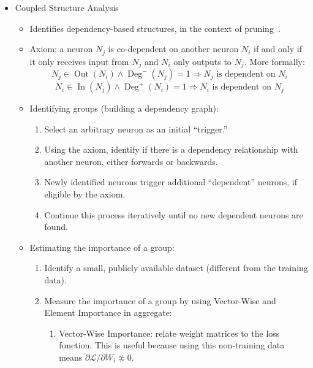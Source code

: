 
\begin{itemize}
    \item Coupled Structure Analysis
    \begin{itemize}
        \item Identifies dependency-based structures, in the context of pruning~\cite{ma2023llm}.
        \item Axiom: a neuron $N_j$ is co-dependent on another neuron $N_i$ if and only if it only receives input from $N_j$ and $N_i$ only outputs to $N_j$.
         More formally:
        \begin{equation}
             N_j \in \operatorname{Out}(N_i) \wedge \operatorname{Deg}^-(N_j) = 1 \Rightarrow N_j \text{ is dependent on } N_i\label{eq:equation}
        \end{equation}
        \begin{equation}
             N_i \in \operatorname{In}(N_j) \wedge \operatorname{Deg}^+(N_i) = 1 \Rightarrow N_i \text{ is dependent on } N_j\label{eq:equation2}
        \end{equation}
        \item Identifying groups (building a dependency graph):
        \begin{enumerate}
            \item Select an arbitrary neuron as an initial ``trigger.''
            \item Using the axiom, identify if there is a dependency relationship with another neuron, either forwards or backwards.
            \item Newly identified neurons trigger additional ``dependent'' neurons, if eligible by the axiom.
            \item Continue this process iteratively until no new dependent neurons are found.
        \end{enumerate}
        \item Estimating the importance of a group:
        \begin{enumerate}
            \item Identify a small, publicly available dataset (different from the training data).
            \item Measure the importance of a group by using Vector-Wise and Element Importance in aggregate:
            \begin{enumerate}
                \item Vector-Wise Importance: relate weight matrices to the loss function.
                This is useful because using this non-training data means ${\partial \mathcal{L}}/{\partial W_i} \not \approx 0$.

\end{enumerate}
\end{enumerate}
\end{itemize}
\end{itemize}
